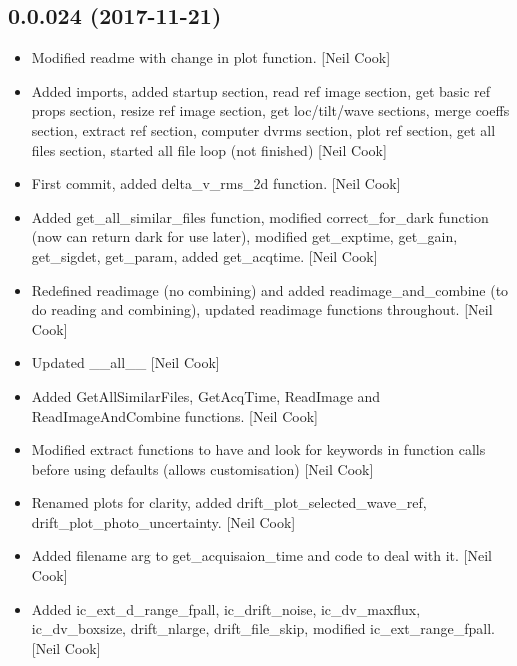 \documentclass[a4paper,10pt,english]{report}
\begin{document}
\subsection{0.0.024 (2017-11-21)}
\label{\detokenize{misc/changelog:id526}}\begin{itemize}
\item {} 
Modified readme with change in plot function. {[}Neil Cook{]}

\item {} 
Added imports, added startup section, read ref image section, get
basic ref props section, resize ref image section, get loc/tilt/wave
sections, merge coeffs section, extract ref section, computer dvrms
section, plot ref section, get all files section, started all file
loop (not finished) {[}Neil Cook{]}

\item {} 
First commit, added delta\_v\_rms\_2d function. {[}Neil Cook{]}

\item {} 
Added get\_all\_similar\_files function, modified correct\_for\_dark
function (now can return dark for use later), modified get\_exptime,
get\_gain, get\_sigdet, get\_param, added get\_acqtime. {[}Neil Cook{]}

\item {} 
Redefined readimage (no combining) and added readimage\_and\_combine (to
do reading and combining), updated readimage functions throughout.
{[}Neil Cook{]}

\item {} 
Updated \_\_all\_\_ {[}Neil Cook{]}

\item {} 
Added GetAllSimilarFiles, GetAcqTime, ReadImage and
ReadImageAndCombine functions. {[}Neil Cook{]}

\item {} 
Modified extract functions to have and look for keywords in function
calls before using defaults (allows customisation) {[}Neil Cook{]}

\item {} 
Renamed plots for clarity, added drift\_plot\_selected\_wave\_ref,
drift\_plot\_photo\_uncertainty. {[}Neil Cook{]}

\item {} 
Added filename arg to get\_acquisaion\_time and code to deal with it.
{[}Neil Cook{]}

\item {} 
Added ic\_ext\_d\_range\_fpall, ic\_drift\_noise, ic\_dv\_maxflux,
ic\_dv\_boxsize, drift\_nlarge, drift\_file\_skip, modified
ic\_ext\_range\_fpall. {[}Neil Cook{]}


\end{itemize}
\end{document}
